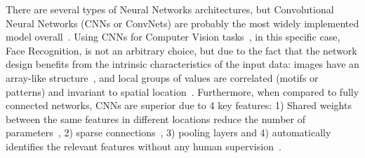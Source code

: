 \documentclass[class=report, crop=false, a4paper, 12pt]{standalone}
\begin{document}
\par There are several types of Neural Networks architectures, but Convolutional Neural Networks (CNNs or ConvNets) are probably the most widely implemented model overall~\autocite{yamashitaConvolutionalNeuralNetworks2018, liSurveyConvolutionalNeural2022}. Using CNNs for Computer Vision tasks~\autocite{krizhevskyImageNetClassificationDeep2012,taigmanDeepFaceClosingGap2014,tompsonEfficientObjectLocalization2015, zhangImprovedBreastCancer2021}, in this specific case, Face Recognition, is not an arbitrary choice, but due to the fact that the network design benefits from the intrinsic characteristics of the input data: images have an array-like structure~\autocite{yamashitaConvolutionalNeuralNetworks2018}, and local groups of values are correlated (motifs or patterns) and invariant to spatial location~\autocite{lecunDeepLearning2015,caoReviewNeuralNetworks2018}. Furthermore, when compared to fully connected networks, CNNs are superior due to 4 key features: 1) Shared weights between the same features in different locations reduce the number of parameters~\autocite{liSurveyConvolutionalNeural2022}, 2) sparse connections~\autocite{alzubaidiReviewDeepLearning2021}, 3) pooling layers and 4) automatically identifies the relevant features without any human supervision~\autocite{alzubaidiReviewDeepLearning2021,liSurveyConvolutionalNeural2022}.
\end{document}
